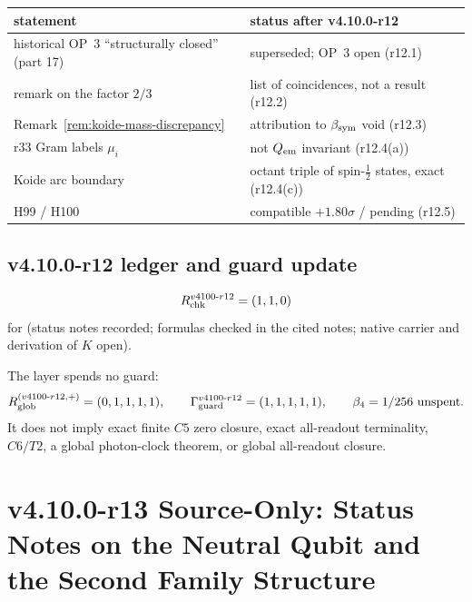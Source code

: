 \begin{center}
\small
\begin{tabular}{@{}>{\raggedright\arraybackslash}p{}>{\raggedright\arraybackslash}p{}@{}}
\toprule
statement & status after v4.10.0-r12\\
\midrule
historical OP~3 ``structurally closed'' (part 17) & superseded; OP~3 open (r12.1)\\
remark on the factor \(2/3\) & list of coincidences, not a result (r12.2)\\
Remark~\ref{rem:koide-mass-discrepancy} & attribution to \(\beta_{\rm sym}\) void (r12.3)\\
r33 Gram labels \(\mu_i\) & not \(Q_{\rm em}\) invariant (r12.4(a))\\
Koide arc boundary & octant triple of spin-\(\tfrac12\) states, exact (r12.4(c))\\
H99 / H100 & compatible \(+1.80\sigma\) / pending (r12.5)\\
\bottomrule
\end{tabular}
\end{center}

\subsection*{v4.10.0-r12 ledger and guard update}
\label{subsec:v4100-r12-ledger-guard}

\[
R_{\rm chk}^{v4100\text{-}r12}=(1,1,0)
\]
for (status notes recorded; formulas checked in the cited notes; native carrier and derivation of \(K\) open).

The layer spends no guard:
\[
R_{\rm glob}^{(v4100\text{-}r12,+)}=(0,1,1,1,1),
\qquad
\Gamma_{\rm guard}^{v4100\text{-}r12}=(1,1,1,1,1),
\qquad
\beta_4=1/256\ \text{unspent}.
\]
It does not imply exact finite \(C5\) zero closure, exact all-readout terminality,
\(C6/T2\), a global photon-clock theorem, or global all-readout closure.

\clearpage
\section*{v4.10.0-r13 Source-Only: Status Notes on the Neutral Qubit and the Second Family Structure}
\label{sec:v4100-r13-neutral-qubit-family}

